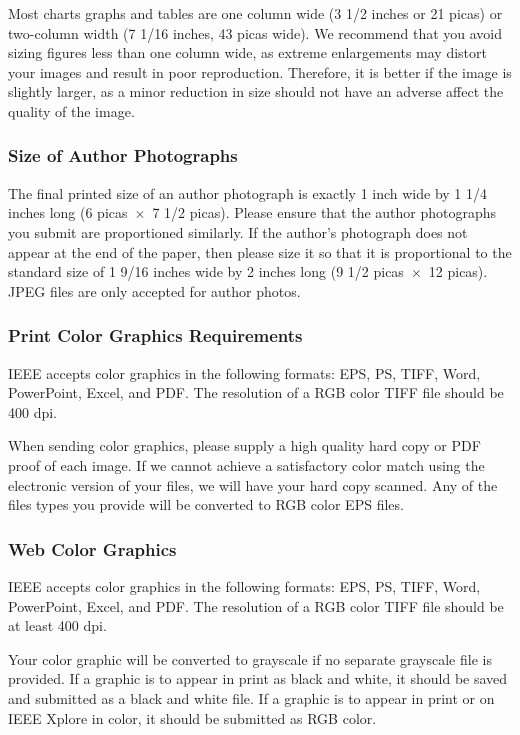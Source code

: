 \documentclass[transmag]{IEEEtran}
\begin{document}
Most charts graphs and tables are one column wide (3 1/2 inches or 21 picas) 
or two-column width (7 1/16 inches, 43 picas wide). We recommend that you 
avoid sizing figures less than one column wide, as extreme enlargements may 
distort your images and result in poor reproduction. Therefore, it is better 
if the image is slightly larger, as a minor reduction in size should not 
have an adverse affect the quality of the image. 

\subsubsection*{Size of Author Photographs}

The final printed size of an author photograph is exactly 
1 inch wide by 1 1/4 inches long (6 picas~$\times$~7 1/2 picas). Please 
ensure that the author photographs you submit are proportioned similarly. If 
the author's photograph does not appear at the end of the paper, then please 
size it so that it is proportional to the standard size of 1 9/16 inches 
wide by 
2 inches long (9 1/2 picas~$\times$~12 picas). JPEG files are only 
accepted for author photos.

\subsubsection*{Print Color Graphics Requirements}

IEEE accepts color graphics in the following formats: EPS, PS, TIFF, Word, 
PowerPoint, Excel, and PDF. The resolution of a RGB color TIFF file should 
be 400 dpi. 

When sending color graphics, please supply a high quality hard copy or PDF 
proof of each image. If we cannot achieve a satisfactory color match using 
the electronic version of your files, we will have your hard copy scanned. 
Any of the files types you provide will be converted to RGB color EPS files. 

\subsubsection*{Web Color Graphics}

IEEE accepts color graphics in the following formats: EPS, PS, TIFF, Word, 
PowerPoint, Excel, and PDF. The resolution of a RGB color TIFF file should 
be at least 400 dpi. 

Your color graphic will be converted to grayscale if no separate grayscale 
file is provided. If a graphic is to appear in print as black and white, it 
should be saved and submitted as a black and white file. If a graphic is to 
appear in print or on IEEE Xplore in color, it should be submitted as RGB 
color. 
\end{document}
